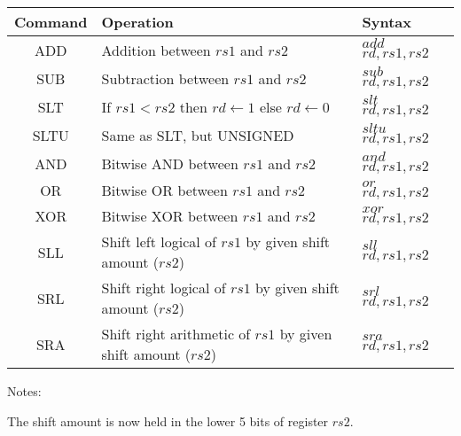 	\begin{threeparttable}
		\begin{tabular}{|c|p{3in}|p{1in}|} \hline
			\setrow{\bfseries}Command &\setrow{\bfseries} Operation &\setrow{\bfseries} Syntax 	\\\hline
			\cellcolor{bred}ADD & {\small Addition between $rs1$ and $rs2$} & {\small $add$ $rd,rs1,rs2$} 	\\\hline
			\cellcolor{bred}SUB & {\small Subtraction between $rs1$ and $rs2$} & {\small $sub$ $rd,rs1,rs2$}  \\\hline
			\cellcolor{bred}SLT & {\small If $rs1<rs2$ then $rd\leftarrow1$ else $rd\leftarrow0$} & {\small $slt$ $rd,rs1,rs2$} \\\hline
			\cellcolor{bred}SLTU & {\small Same as SLT, but UNSIGNED} &{\small $sltu$ $rd,rs1,rs2$} 			\\\hline
			\cellcolor{bred}AND  & {\small Bitwise AND between $rs1$ and $rs2$} & {\small $and$ $rd,rs1,rs2$} \\\hline
			\cellcolor{bred}OR   & {\small Bitwise OR between $rs1$ and $rs2$}  & {\small $or$ $rd,rs1,rs2$}  \\\hline
			\cellcolor{bred}XOR  & {\small Bitwise XOR between $rs1$ and $rs2$} & {\small $xor$ $rd,rs1,rs2$} \\\hline
			\cellcolor{bred} SLL & {\small Shift left logical of $rs1$ by given shift amount ($rs2$)}& {\small $sll$ $rd,rs1,rs2$} \\\hline
			\cellcolor{bred} SRL & {\small Shift right logical of $rs1$ by given shift amount ($rs2$)} & {\small $srl$ $rd,rs1,rs2$} \\\hline
			\cellcolor{bred} SRA & {\footnotesize Shift right arithmetic of $rs1$ by given shift amount ($rs2$)} & {\small $sra$ $rd,rs1,rs2$} \\\hline
			
		\end{tabular}
	
		 \begin{tablenotes}
			
			\footnotesize
			\item Notes:
			\item
			The shift amount is now held in the lower 5 bits of register $rs2$.
			\label{subsubsec:table2.3}
			\vspace{5mm}
		\end{tablenotes}

	\end{threeparttable}
	
